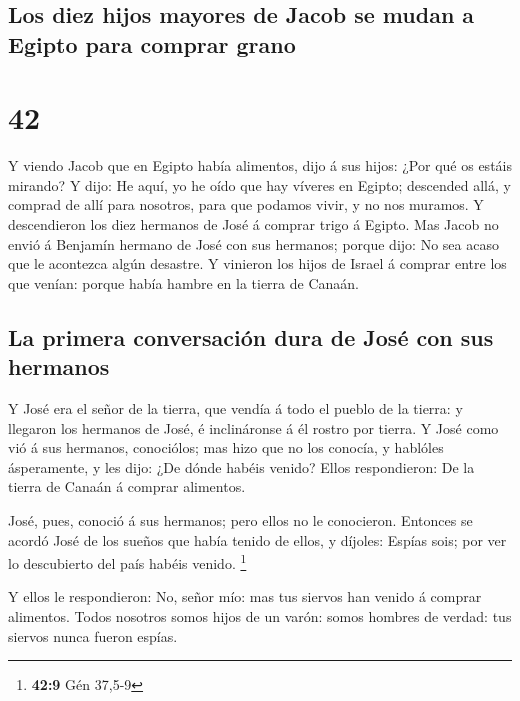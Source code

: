 \hypertarget{los-diez-hijos-mayores-de-jacob-se-mudan-a-egipto-para-comprar-grano}{%
\subsection{Los diez hijos mayores de Jacob se mudan a Egipto para
comprar
grano}\label{los-diez-hijos-mayores-de-jacob-se-mudan-a-egipto-para-comprar-grano}}

\hypertarget{section-41}{%
\section{42}\label{section-41}}

 Y viendo Jacob que en Egipto había alimentos, dijo á sus
hijos: ¿Por qué os estáis mirando?  Y dijo: He aquí, yo he
oído que hay víveres en Egipto; descended allá, y comprad de allí para
nosotros, para que podamos vivir, y no nos muramos.  Y
descendieron los diez hermanos de José á comprar trigo á Egipto.
 Mas Jacob no envió á Benjamín hermano de José con sus
hermanos; porque dijo: No sea acaso que le acontezca algún desastre.
 Y vinieron los hijos de Israel á comprar entre los que
venían: porque había hambre en la tierra de Canaán.

\hypertarget{la-primera-conversaciuxf3n-dura-de-josuxe9-con-sus-hermanos}{%
\subsection{La primera conversación dura de José con sus
hermanos}\label{la-primera-conversaciuxf3n-dura-de-josuxe9-con-sus-hermanos}}

 Y José era el señor de la tierra, que vendía á todo el
pueblo de la tierra: y llegaron los hermanos de José, é inclináronse á
él rostro por tierra.  Y José como vió á sus hermanos,
conociólos; mas hizo que no los conocía, y hablóles ásperamente, y les
dijo: ¿De dónde habéis venido? Ellos respondieron: De la tierra de
Canaán á comprar alimentos.

 José, pues, conoció á sus hermanos; pero ellos no le
conocieron.  Entonces se acordó José de los sueños que
había tenido de ellos, y díjoles: Espías sois; por ver lo descubierto
del país habéis venido. \footnote{\textbf{42:9} Gén 37,5-9}

 Y ellos le respondieron: No, señor mío: mas tus siervos
han venido á comprar alimentos.  Todos nosotros somos
hijos de un varón: somos hombres de verdad: tus siervos nunca fueron
espías.

